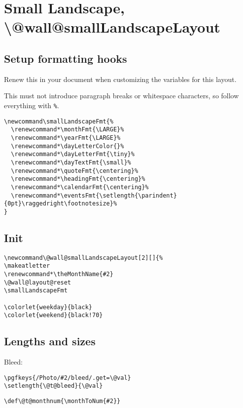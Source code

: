 \documentclass[11pt,oneside]{memoir-article}
\begin{document}
\section{Small Landscape, \textbackslash @wall@smallLandscapeLayout}
\label{sec:orgec90d96}
\subsection{Setup formatting hooks}
\label{sec:org19590f3}

Renew this in your document when customizing the variables for this layout.

This must not introduce paragraph breaks or whitespace characters, so follow
everything with \texttt{\%}.

\begin{verbatim}
\newcommand\smallLandscapeFmt{%
  \renewcommand*\monthFmt{\LARGE}%
  \renewcommand*\yearFmt{\LARGE}%
  \renewcommand*\dayLetterColor{}%
  \renewcommand*\dayLetterFmt{\tiny}%
  \renewcommand*\dayTextFmt{\small}%
  \renewcommand*\quoteFmt{\centering}%
  \renewcommand*\headingFmt{\centering}%
  \renewcommand*\calendarFmt{\centering}%
  \renewcommand*\eventsFmt{\setlength{\parindent}{0pt}\raggedright\footnotesize}%
}
\end{verbatim}

\subsection{Init}
\label{sec:org11161c1}

\begin{verbatim}
\newcommand\@wall@smallLandscapeLayout[2][]{%
\makeatletter
\renewcommand*\theMonthName{#2}
\@wall@layout@reset
\smallLandscapeFmt

\colorlet{weekday}{black}
\colorlet{weekend}{black!70}
\end{verbatim}

\subsection{Lengths and sizes}
\label{sec:orgcdfd5b1}

Bleed:

\begin{verbatim}
\pgfkeys{/Photo/#2/bleed/.get=\@val}
\setlength{\@t@bleed}{\@val}
\end{verbatim}

\begin{verbatim}
\def\@t@monthnum{\monthToNum{#2}}
\end{verbatim}
\end{document}
